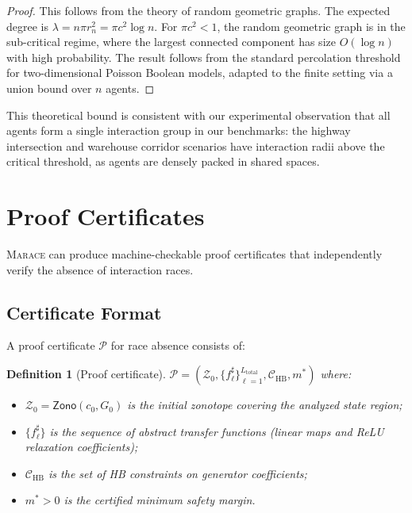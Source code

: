 \documentclass[11pt]{article}
\newtheorem{definition}[theorem]{Definition}
\newcommand{\calZ}{\mathcal{Z}}
\newcommand{\calP}{\mathcal{P}}
\newcommand{\calC}{\mathcal{C}}
\newcommand{\zo}{\mathsf{Zono}}
\newcommand{\marace}{\textsc{Marace}}
\begin{document}
\begin{proof}
This follows from the theory of random geometric graphs. The expected
degree is $\lambda = n \pi r_n^2 = \pi c^2 \log n$. For $\pi c^2 < 1$,
the random geometric graph is in the sub-critical regime, where the
largest connected component has size $O(\log n)$ with high probability.
The result follows from the standard percolation threshold for
two-dimensional Poisson Boolean models, adapted to the finite setting
via a union bound over $n$ agents.
\end{proof}

This theoretical bound is consistent with our experimental observation
that all agents form a single interaction group in our benchmarks:
the highway intersection and warehouse corridor scenarios have
interaction radii above the critical threshold, as agents are densely
packed in shared spaces.


\section{Proof Certificates}
\label{app:certificates}

\marace{} can produce machine-checkable proof certificates that
independently verify the absence of interaction races.

\subsection{Certificate Format}

A proof certificate $\calP$ for race absence consists of:

\begin{definition}[Proof certificate]
\label{def:certificate}
$\calP = (\calZ_0, \{f^\sharp_\ell\}_{\ell=1}^{L_{\text{total}}}, \calC_{\text{HB}}, m^*)$
where:
\begin{itemize}[nosep]
\item $\calZ_0 = \zo(c_0, G_0)$ is the initial zonotope covering the
analyzed state region;
\item $\{f^\sharp_\ell\}$ is the sequence of abstract transfer functions
(linear maps and ReLU relaxation coefficients);
\item $\calC_{\text{HB}}$ is the set of HB constraints on generator
coefficients;
\item $m^* > 0$ is the certified minimum safety margin.
\end{itemize}
\end{definition}
\end{document}
